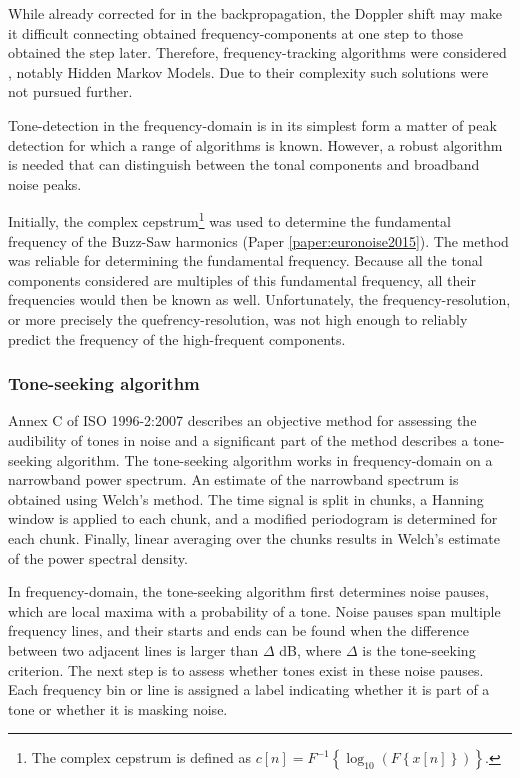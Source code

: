 While already corrected for in the backpropagation, the Doppler shift may make
it difficult connecting obtained frequency-components at one step to those
obtained the step later. Therefore, frequency-tracking algorithms were
considered \cite{Lampert2010}, notably Hidden Markov Models. Due to their
complexity such solutions were not pursued further.

Tone-detection in the frequency-domain is in its simplest form a matter of peak
detection for which a range of algorithms is known. However, a robust algorithm
is needed that can distinguish between the tonal components and broadband noise
peaks.

Initially, the complex cepstrum\footnote{The complex cepstrum is defined as
$c[n] = F^{-1}\left\{\log_{10}{\left( F \left\{x[n]\right\} \right)}\right\}$.}
was used to determine the fundamental frequency of the Buzz-Saw harmonics
(Paper \ref{paper:euronoise2015}). The method was reliable for determining the
fundamental frequency. Because all the tonal components considered are multiples
of this fundamental frequency, all their frequencies would then be known as
well. Unfortunately, the frequency-resolution, or more precisely the
quefrency-resolution, was not high enough to reliably predict the frequency of
the high-frequent components.

\subsubsection*{Tone-seeking algorithm}
Annex C of ISO 1996-2:2007 \cite{ISO1996-2_2007} describes an objective method
for assessing the audibility of tones in noise and a significant part of the
method describes a tone-seeking algorithm. The tone-seeking algorithm works in
frequency-domain on a narrowband power spectrum. An estimate of the narrowband
spectrum is obtained using Welch's method. The time signal is split in chunks, a
Hanning window is applied to each chunk, and a modified periodogram is determined for
each chunk. Finally, linear averaging over the chunks results in Welch's
estimate of the power spectral density.

In frequency-domain, the tone-seeking algorithm first determines noise pauses,
which are local maxima with a probability of a tone. Noise pauses span multiple
frequency lines, and their starts and ends can be found when the difference
between two adjacent lines is larger than $\Delta$ dB, where $\Delta$ is the
tone-seeking criterion. The next step is to assess whether tones exist in these
noise pauses. Each frequency bin or line is assigned a label indicating whether
it is part of a tone or whether it is masking noise.


